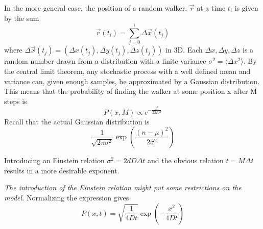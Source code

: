 In the more general case, the position of a random walker, $\vec{r}$ at a time $t_i$ is given by the sum
\begin{equation}\label{brownian_motion}
 \vec{r}(t_i)=\sum\limits_{j=0}^i \Delta \vec{x}(t_j)
\end{equation}
where $\Delta \vec{x}(t_j) = \left(\Delta x(t_j),\Delta y(t_j),\Delta z(t_j)\right)$ in 3D. Each $\Delta x,\Delta y,\Delta z$ is a random number drawn from a distribution with a finite variance $\sigma^2 = \langle\Delta x^2\rangle$. 
By the central limit theorem, any stochastic process with a well defined mean and variance can, given enough samples, be approximated by a Gaussian distribution. 
This means that the probability of finding the walker at some position x after M steps is 
\begin{equation}
 P(x,M)\propto e^{-\frac{x^2}{2M\sigma^2}}
\end{equation}
Recall that the actual Gaussian distribution is 
$$
\frac{1}{\sqrt{2\pi\sigma^2}}\exp\left(\frac{(n-\mu)^2}{2\sigma^2}\right)
$$

Introducing an Einstein relation $\sigma^2 = 2dD\Delta t$ and the obvious relation $t = M\Delta t$ results in a more desirable exponent. 

\emph{The introduction of the Einstein relation might put some restrictions on the model.}
Normalizing the expression gives
\begin{equation}\label{rw_gaussian_distribution}
 P(x,t) = \sqrt{\frac{1}{4Dt}}\exp\left(-\frac{x^2}{4Dt}\right)
\end{equation}

